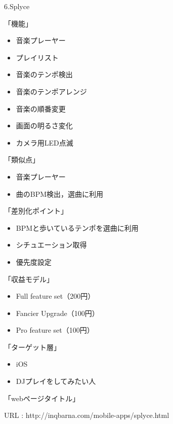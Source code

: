 \par
6.Splyce
\par
「機能」
\begin{itemize}
\item 音楽プレーヤー
\item プレイリスト
\item 音楽のテンポ検出
\item 音楽のテンポアレンジ
\item 音楽の順番変更
\item 画面の明るさ変化
\item カメラ用LED点滅
\end{itemize}

「類似点」
\begin{itemize}
\item 音楽プレーヤー
\item 曲のBPM検出，選曲に利用
\end{itemize}

「差別化ポイント」
\begin{itemize}
\item BPMと歩いているテンポを選曲に利用
\item シチュエーション取得
\item 優先度設定
\end{itemize}

「収益モデル」
\begin{itemize}
\item Full feature set（200円）
\item Fancier Upgrade（100円）
\item Pro feature set（100円）
\end{itemize}

「ターゲット層」
\begin{itemize}
\item iOS
\item DJプレイをしてみたい人
\end{itemize}
「webページタイトル」
\par
URL : http://inqbarna.com/mobile-apps/splyce.html

\par
{}
